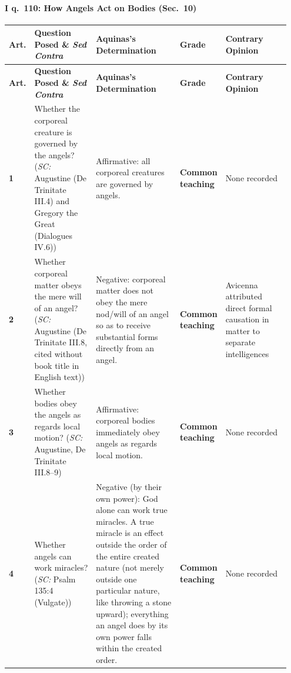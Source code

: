 \paragraph{I q.~110: How Angels Act on Bodies (Sec.~10)}
{\scriptsize
\setlength{\tabcolsep}{2.5pt}
\renewcommand{\arraystretch}{1.15}
\begin{longtable}{>{\raggedright\arraybackslash}p{0.05\linewidth}>{\raggedright\arraybackslash}p{0.23\linewidth}>{\raggedright\arraybackslash}p{0.31\linewidth}>{\raggedright\arraybackslash}p{0.12\linewidth}>{\raggedright\arraybackslash}p{0.24\linewidth}}
\toprule
\textbf{Art.} & \textbf{Question Posed \& \emph{Sed Contra}} & \textbf{Aquinas's Determination} & \textbf{Grade} & \textbf{Contrary Opinion} \\
\midrule
\endfirsthead
\toprule
\textbf{Art.} & \textbf{Question Posed \& \emph{Sed Contra}} & \textbf{Aquinas's Determination} & \textbf{Grade} & \textbf{Contrary Opinion} \\
\midrule
\endhead
\bottomrule
\endfoot
\textbf{1} & Whether the corporeal creature is governed by the angels? (\emph{SC:} Augustine (De Trinitate III.4) and Gregory the Great (Dialogues IV.6)) & Affirmative: all corporeal creatures are governed by angels. & \textbf{Common teaching} & None recorded \\
\addlinespace[1.5pt]
\textbf{2} & Whether corporeal matter obeys the mere will of an angel? (\emph{SC:} Augustine (De Trinitate III.8, cited without book title in English text)) & Negative: corporeal matter does not obey the mere nod/will of an angel so as to receive substantial forms directly from an angel. & \textbf{Common teaching} & Avicenna attributed direct formal causation in matter to separate intelligences \\
\addlinespace[1.5pt]
\textbf{3} & Whether bodies obey the angels as regards local motion? (\emph{SC:} Augustine, De Trinitate III.8--9) & Affirmative: corporeal bodies immediately obey angels as regards local motion. & \textbf{Common teaching} & None recorded \\
\addlinespace[1.5pt]
\textbf{4} & Whether angels can work miracles? (\emph{SC:} Psalm 135:4 (Vulgate)) & Negative (by their own power): God alone can work true miracles. A true miracle is an effect outside the order of the entire created nature (not merely outside one particular nature, like throwing a stone upward); everything an angel does by its own power falls within the created order. & \textbf{Common teaching} & None recorded \\
\end{longtable}
}

